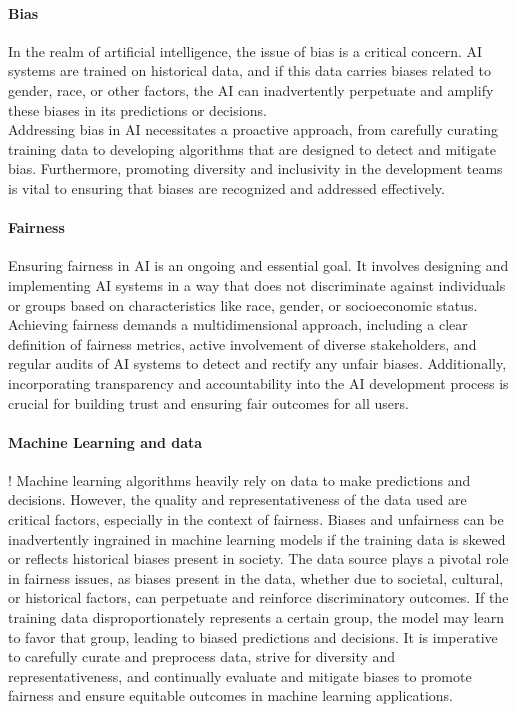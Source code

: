 \documentclass[12pt,a4paper,openright,twoside]{book}
\begin{document}
\paragraph{Bias}
In the realm of artificial intelligence, the issue of bias is a critical concern. AI systems are trained on historical data, and if this data carries biases related to gender, race, or other factors, the AI can inadvertently perpetuate and amplify these biases in its predictions or decisions. \\
Addressing bias in AI necessitates a proactive approach, from carefully curating training data to developing algorithms that are designed to detect and mitigate bias. Furthermore, promoting diversity and inclusivity in the development teams is vital to ensuring that biases are recognized and addressed effectively. \cite{10.1145/3457607}
\paragraph{Fairness}
Ensuring fairness in AI is an ongoing and essential goal. It involves designing and implementing AI systems in a way that does not discriminate against individuals or groups based on characteristics like race, gender, or socioeconomic status. Achieving fairness demands a multidimensional approach, including a clear definition of fairness metrics, active involvement of diverse stakeholders, and regular audits of AI systems to detect and rectify any unfair biases. Additionally, incorporating transparency and accountability into the AI development process is crucial for building trust and ensuring fair outcomes for all users. \cite{10.1145/3457607} \cite{10.1145/3194770.3194776}
\paragraph{Machine Learning and data}
! Machine learning algorithms heavily rely on data to make predictions and decisions. However, the quality and representativeness of the data used are critical factors, especially in the context of fairness. Biases and unfairness can be inadvertently ingrained in machine learning models if the training data is skewed or reflects historical biases present in society. The data source plays a pivotal role in fairness issues, as biases present in the data, whether due to societal, cultural, or historical factors, can perpetuate and reinforce discriminatory outcomes. If the training data disproportionately represents a certain group, the model may learn to favor that group, leading to biased predictions and decisions. It is imperative to carefully curate and preprocess data, strive for diversity and representativeness, and continually evaluate and mitigate biases to promote fairness and ensure equitable outcomes in machine learning applications.
\end{document}
